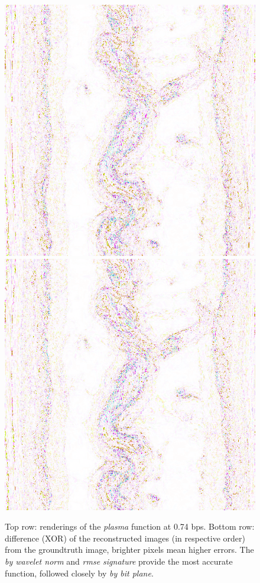 \begin{figure}[h]
{	{\includegraphics[width=0.24\linewidth]{img/rmse/plasma_curr_func0_diff.png}}
	{\includegraphics[width=0.24\linewidth]{img/rmse/signature_curr_func0_diff.png}}}
	
	\caption{Top row:	renderings of the \emph{plasma} function at 0.74 bps. Bottom row: difference
	(XOR) of the reconstructed images (in respective order) from the groundtruth image, brighter
	pixels mean higher errors. The \emph{by wavelet norm} and \emph{rmse signature} provide the most
	accurate function, followed closely by \emph{by bit plane}.}
 	\label{fig:rmse-rendering}
\end{figure}

